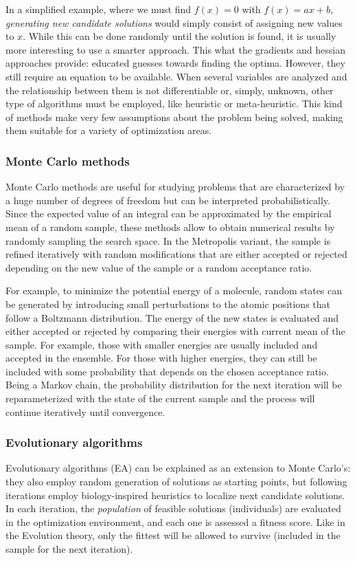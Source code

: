 In a simplified example, where we must find $f(x) = 0$ with $f(x) = ax + b$, \textit{generating new candidate solutions} would simply consist of assigning new values to $x$. While this can be done randomly until the solution is found, it is usually more interesting to use a smarter approach. This what the gradients and hessian approaches provide: educated guesses towards finding the optima. However, they still require an equation to be available. When several variables are analyzed and the relationship between them is not differentiable or, simply, unknown, other type of algorithms must be employed, like heuristic or meta-heuristic. This kind of methods make very few assumptions about the problem being solved, making them suitable for a variety of optimization areas.

\subsubsection{Monte Carlo methods}

Monte Carlo methods are useful for studying problems that are characterized by a huge number of degrees of freedom but can be interpreted probabilistically. Since the expected value of an integral can be approximated by the empirical mean of a random sample, these methods allow to obtain numerical results by randomly sampling the search space.  In the Metropolis variant, the sample is refined iteratively with random modifications that are either accepted or rejected depending on the new value of the sample or a random acceptance ratio.

For example, to minimize the potential energy of a molecule, random states can be generated by introducing small perturbations to the atomic positions that follow a Boltzmann distribution. The energy of the new states is evaluated and either accepted or rejected by comparing their energies with current mean of the sample. For example, those with smaller energies are usually included and accepted in the ensemble. For those with higher energies, they can still be included with some probability that depends on the chosen acceptance ratio. Being a Markov chain, the probability distribution for the next iteration will be reparameterized with the state of the current sample and the process will continue iteratively until convergence.

\subsubsection{Evolutionary algorithms}
Evolutionary algorithms (EA) can be explained as an extension to Monte Carlo's: they also employ random generation of solutions as starting points, but following iterations employ biology-inspired heuristics to localize next candidate solutions. In each iteration, the \textit{population} of feasible solutions (individuals) are evaluated in the optimization environment, and each one is assessed a fitness score. Like in the Evolution theory, only the fittest will be allowed to survive (included in the sample for the next iteration).


